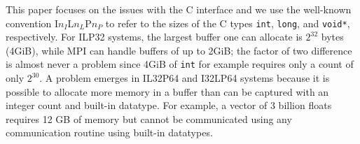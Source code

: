 


This paper focuses on the issues with the C interface and we use the
well-known convention I$n_{I}$L$n_{L}$P$n_{P}$ to refer to the sizes
of the C types \texttt{int}, \texttt{long}, and \texttt{void*}, respectively.
For ILP32 systems, the largest buffer one can allocate is $2^{32}$ bytes (4GiB),
while MPI can handle buffers of up to 2GiB; the factor of two difference is
almost never a problem since 4GiB of \texttt{int} for example requires only
a count of only $2^{30}$.
 A problem emerges in IL32P64 and I32LP64 systems because it is possible to allocate
 more memory in a buffer than can be captured with an integer count and built-in datatype.
 For example, a vector of 3 billion floats requires 12 GB of memory but cannot be 
 communicated using any communication routine using built-in datatypes.

